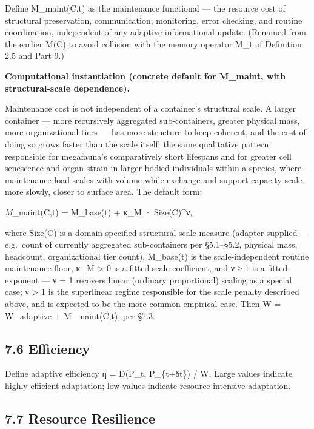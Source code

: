 \documentclass[
]{article}
\begin{document}
Define M\_maint(C,t) as the maintenance functional --- the resource cost
of structural preservation, communication, monitoring, error checking,
and routine coordination, independent of any adaptive informational
update. (Renamed from the earlier M(C) to avoid collision with the
memory operator M\_t of Definition 2.5 and Part 9.)

\textbf{Computational instantiation (concrete default for M\_maint, with
structural-scale dependence).}

Maintenance cost is not independent of a container's structural scale. A
larger container --- more recursively aggregated sub-containers, greater
physical mass, more organizational tiers --- has more structure to keep
coherent, and the cost of doing so grows faster than the scale itself:
the same qualitative pattern responsible for megafauna's comparatively
short lifespans and for greater cell senescence and organ strain in
larger-bodied individuals within a species, where maintenance load
scales with volume while exchange and support capacity scale more
slowly, closer to surface area. The default form:

\emph{M}\_maint(C,t) = M\_base(t) + κ\_M · Size(C)\^{}ν,

where Size(C) is a domain-specified structural-scale measure
(adapter-supplied --- e.g.~count of currently aggregated sub-containers
per §5.1--§5.2, physical mass, headcount, organizational tier count),
M\_base(t) is the scale-independent routine maintenance floor, κ\_M
\textgreater{} 0 is a fitted scale coefficient, and ν ≥ 1 is a fitted
exponent --- ν = 1 recovers linear (ordinary proportional) scaling as a
special case; ν \textgreater{} 1 is the superlinear regime responsible
for the scale penalty described above, and is expected to be the more
common empirical case. Then W = W\_adaptive + M\_maint(C,t), per §7.3.

\hypertarget{efficiency}{%
\subsection{7.6 Efficiency}\label{efficiency}}

Define adaptive efficiency η = D(P\_t, P\_\{t+δt\}) / W. Large values
indicate highly efficient adaptation; low values indicate
resource-intensive adaptation.

\hypertarget{resource-resilience}{%
\subsection{7.7 Resource Resilience}\label{resource-resilience}}
\end{document}
